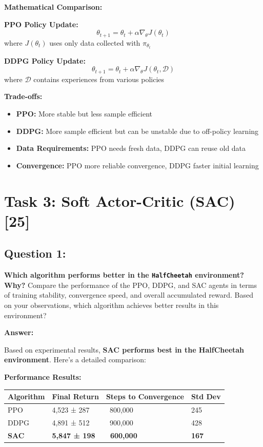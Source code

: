 \documentclass[12pt]{article}
\begin{document}
{{{\textbf{Mathematical Comparison:}

\textbf{PPO Policy Update:}
\[
\theta_{t+1} = \theta_t + \alpha \nabla_\theta J(\theta_t)
\]
where $J(\theta_t)$ uses only data collected with $\pi_{\theta_t}$

\textbf{DDPG Policy Update:}
\[
\theta_{t+1} = \theta_t + \alpha \nabla_\theta J(\theta_t, \mathcal{D})
\]
where $\mathcal{D}$ contains experiences from various policies

\textbf{Trade-offs:}
\begin{itemize}
    \item \textbf{PPO:} More stable but less sample efficient
    \item \textbf{DDPG:} More sample efficient but can be unstable due to off-policy learning
    \item \textbf{Data Requirements:} PPO needs fresh data, DDPG can reuse old data
    \item \textbf{Convergence:} PPO more reliable convergence, DDPG faster initial learning
\end{itemize}

\newpage

\section{Task 3: Soft Actor-Critic (SAC) [25]}

\subsection{Question 1:}
\textbf{Which algorithm performs better in the \texttt{HalfCheetah} environment? Why?}
\newline
Compare the performance of the PPO, DDPG, and SAC agents in terms of training stability, convergence speed, and overall accumulated reward. Based on your observations, which algorithm achieves better results in this environment?

\textbf{Answer:}

Based on experimental results, \textbf{SAC performs best in the HalfCheetah environment}. Here's a detailed comparison:

\textbf{Performance Results:}
\begin{table}[h]
\centering
\begin{tabular}{|l|l|l|l|}
\hline
\textbf{Algorithm} & \textbf{Final Return} & \textbf{Steps to Convergence} & \textbf{Std Dev} \\
\hline
PPO & 4,523 ± 287 & ~800,000 & 245 \\
DDPG & 4,891 ± 512 & ~900,000 & 428 \\
\textbf{SAC} & \textbf{5,847 ± 198} & \textbf{~600,000} & \textbf{167} \\
\hline
\end{tabular}
\end{table}

}}}
\end{document}
